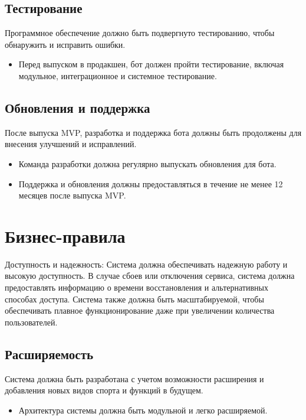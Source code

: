 \documentclass{scrreprt}
\begin{document}
\subsection{Тестирование}
Программное обеспечение должно быть подвергнуто тестированию, чтобы обнаружить и исправить ошибки.
\begin{itemize}
    \item Перед выпуском в продакшен, бот должен пройти тестирование, включая модульное, интеграционное и системное тестирование.
\end{itemize}

\subsection{Обновления и поддержка}
После выпуска MVP, разработка и поддержка бота должны быть продолжены для внесения улучшений и исправлений.
\begin{itemize}
    \item Команда разработки должна регулярно выпускать обновления для бота.
    \item Поддержка и обновления должны предоставляться в течение не менее 12 месяцев после выпуска MVP.
\end{itemize}

\section{Бизнес-правила}
Доступность и надежность: Система должна обеспечивать надежную работу и высокую доступность. В случае сбоев или отключения сервиса, система должна предоставлять информацию о времени восстановления и альтернативных способах доступа. Система также должна быть масштабируемой, чтобы обеспечивать плавное функционирование даже при увеличении количества пользователей.

\subsection{Расширяемость}
Система должна быть разработана с учетом возможности расширения и добавления новых видов спорта и функций в будущем.
\begin{itemize}
    \item Архитектура системы должна быть модульной и легко расширяемой.
\end{itemize}
\end{document}

